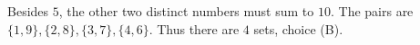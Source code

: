 Besides $5$, the other two distinct numbers must sum to $10$. The pairs are $\{1,9\},\{2,8\},\{3,7\},\{4,6\}$. Thus there are $\boxed4$ sets, choice (B).
